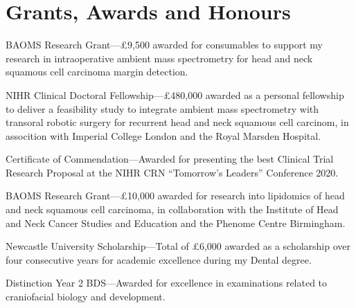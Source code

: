 \section*{Grants, Awards and Honours}

 BAOMS Research Grant---\pounds9,500 awarded for consumables to support my research in intraoperative ambient mass spectrometry for head and neck squamous cell carcinoma margin detection.

 NIHR Clinical Doctoral Fellowship---\pounds480,000 awarded as a personal fellowship to deliver a feasibility study to integrate ambient mass spectrometry with transoral robotic surgery for recurrent head and neck squamous cell carcinom, in assocition with Imperial College London and the Royal Marsden Hospital.

 Certificate of Commendation---Awarded for presenting the best Clinical Trial Research Proposal at the NIHR CRN ``Tomorrow's Leaders'' Conference 2020.

 BAOMS Research Grant---\pounds10,000 awarded for research into lipidomics of head and neck squamous cell carcinoma, in collaboration with the Institute of Head and Neck Cancer Studies and Education and the Phenome Centre Birmingham.

 Newcastle University Scholarship---Total of \pounds6,000 awarded as a scholarship over four consecutive years for academic excellence during my Dental degree.

 Distinction Year 2 BDS---Awarded for excellence in examinations related to craniofacial biology and development.
